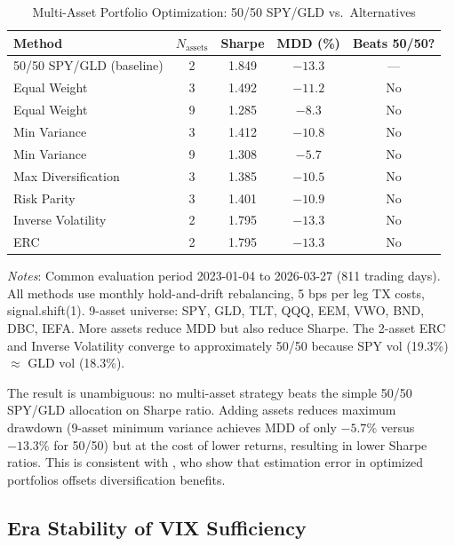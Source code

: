 \documentclass[12pt,a4paper]{article}
\begin{document}
\begin{table}[H]
\centering
\small
\begin{threeparttable}
\caption{Multi-Asset Portfolio Optimization: 50/50 SPY/GLD vs.\ Alternatives}
\label{tab:multiasset}
\begin{tabular}{@{}lcccc@{}}
\toprule
Method & $N_{\text{assets}}$ & Sharpe & MDD (\%) & Beats 50/50? \\
\midrule
50/50 SPY/GLD (baseline) & 2 & 1.849 & $-13.3$ & --- \\
\midrule
Equal Weight & 3 & 1.492 & $-11.2$ & No \\
Equal Weight & 9 & 1.285 & $-8.3$ & No \\
Min Variance & 3 & 1.412 & $-10.8$ & No \\
Min Variance & 9 & 1.308 & $-5.7$ & No \\
Max Diversification & 3 & 1.385 & $-10.5$ & No \\
Risk Parity & 3 & 1.401 & $-10.9$ & No \\
Inverse Volatility & 2 & 1.795 & $-13.3$ & No \\
ERC & 2 & 1.795 & $-13.3$ & No \\
\bottomrule
\end{tabular}
\begin{tablenotes}
\small
\item \textit{Notes}: Common evaluation period 2023-01-04 to 2026-03-27 (811 trading days). All methods use monthly hold-and-drift rebalancing, 5 bps per leg TX costs, signal.shift(1). 9-asset universe: SPY, GLD, TLT, QQQ, EEM, VWO, BND, DBC, IEFA. More assets reduce MDD but also reduce Sharpe. The 2-asset ERC and Inverse Volatility converge to approximately 50/50 because SPY vol (19.3\%) $\approx$ GLD vol (18.3\%).
\end{tablenotes}
\end{threeparttable}
\end{table}

The result is unambiguous: no multi-asset strategy beats the simple 50/50 SPY/GLD allocation on Sharpe ratio. Adding assets reduces maximum drawdown (9-asset minimum variance achieves MDD of only $-5.7\%$ versus $-13.3\%$ for 50/50) but at the cost of lower returns, resulting in lower Sharpe ratios. This is consistent with \citet{demiguel2009}, who show that estimation error in optimized portfolios offsets diversification benefits.

\subsection{Era Stability of VIX Sufficiency}
\end{document}
